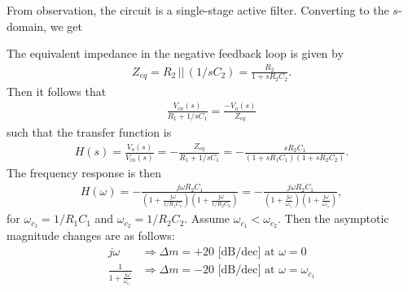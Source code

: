 \documentclass{report}
\begin{document}
\begin{solution}
    From observation, the circuit is a single-stage active filter. Converting to the $s$-domain, we get 
    \begin{center}
    \end{center}
    The equivalent impedance in the negative feedback loop is given by 
    \begin{align*}
        Z_{eq} = R_2\, || \, (1/sC_2) = \frac{R_2}{1+sR_2C_2}.
    \end{align*}
    Then it follows that 
    \begin{align*}
        \frac{V_{in}(s)}{R_1+1/sC_1} = \frac{-V_o(s)}{Z_{eq}}
    \end{align*}
    such that the transfer function is 
    \begin{align*}
        H(s) = \frac{V_o(s)}{V_{in}(s)} = -\frac{Z_{eq}}{R_1+1/sC_1} = -\frac{sR_2C_1}{(1+sR_1C_1)(1+sR_2C_2)}.
    \end{align*}
    The frequency response is then 
    \begin{align*}
        H(\omega) = -\frac{j\omega R_2C_1}{\left(1+\frac{j\omega}{1/R_1C_1}\right)\left(1+\frac{j\omega}{1/R_2C_2}\right)} = -\frac{j\omega R_2C_1}{\left(1+\frac{j\omega}{\omega_{c_1}}\right)\left(1+\frac{j\omega}{\omega_{c_2}}\right)},
    \end{align*}
    for $\omega_{c_1}=1/R_1C_1$ and $\omega_{c_2}=1/R_2C_2$. Assume $\omega_{c_1} < \omega_{c_2}$. Then the asymptotic magnitude changes are as follows:
    \begin{align*}
        j\omega &\Longrightarrow \Delta m = +20 \text{ [dB/dec] at } \omega = 0 \\
        \frac{1}{1+\frac{j\omega}{\omega_{c_1}}} &\Longrightarrow \Delta m = -20 \text{ [dB/dec] at } \omega = \omega_{c_1} \\

\end{align*}
\end{solution}
\end{document}
